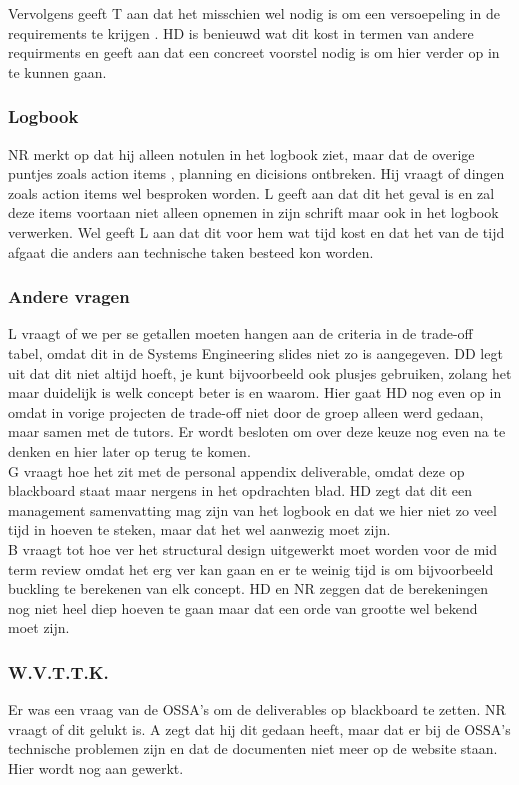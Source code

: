 Vervolgens geeft T aan dat het misschien wel nodig is om een versoepeling in de requirements te krijgen . HD is benieuwd wat dit kost in termen van andere requirments en geeft aan dat een concreet voorstel nodig is om hier verder op in te kunnen gaan.\\

\subsubsection{Logbook}
NR merkt op dat hij alleen notulen in het logbook ziet, maar dat de overige puntjes zoals action items , planning en dicisions ontbreken. Hij vraagt of dingen zoals action items wel besproken worden. L geeft aan dat dit het geval is en zal deze items voortaan niet alleen opnemen in zijn schrift maar ook in het logbook verwerken. Wel geeft L aan dat dit voor hem wat tijd kost en dat het van de tijd afgaat die anders aan technische taken besteed kon worden.

\subsubsection{Andere vragen}
L vraagt of we per se getallen moeten hangen aan de criteria in de trade-off tabel, omdat dit in de Systems Engineering slides niet zo is aangegeven. DD legt uit dat dit niet altijd hoeft, je kunt bijvoorbeeld ook plusjes gebruiken, zolang het maar duidelijk is welk concept beter is en waarom. Hier gaat HD nog even op in omdat in vorige projecten de trade-off niet door de groep alleen werd gedaan, maar samen met de tutors. Er wordt besloten om over deze keuze nog even na te denken en hier later op terug te komen.\\

G vraagt hoe het zit met de personal appendix deliverable, omdat deze op blackboard staat maar nergens in het opdrachten blad. HD zegt dat dit een management samenvatting mag zijn van het logbook en dat we hier niet zo veel tijd in hoeven te steken, maar dat het wel aanwezig moet zijn.\\

B vraagt tot hoe ver het structural design uitgewerkt moet worden voor de mid term review omdat het erg ver kan gaan en er te weinig tijd is om bijvoorbeeld buckling te berekenen van elk concept. HD en NR zeggen dat de berekeningen nog niet heel diep hoeven te gaan maar dat een orde van grootte wel bekend moet zijn.\\

\subsubsection{W.V.T.T.K.}
Er was een vraag van de OSSA's om de deliverables op blackboard te zetten. NR vraagt of dit gelukt is. A zegt dat hij dit gedaan heeft, maar dat er bij de OSSA's technische problemen zijn en dat de documenten niet meer op de website staan. Hier wordt nog aan gewerkt.

